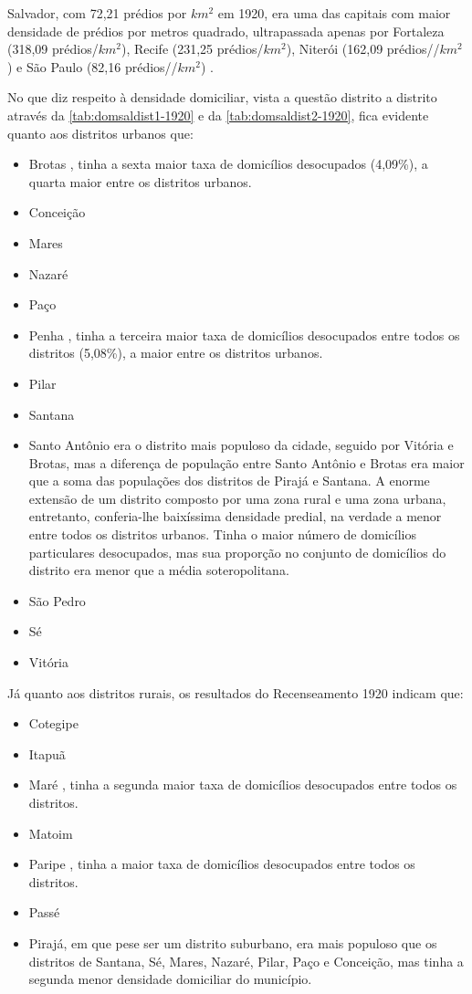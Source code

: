 Salvador, com 72,21 prédios por $km^{2}$ em 1920, era uma das capitais com maior densidade de prédios por metros quadrado, ultrapassada apenas por Fortaleza (318,09 prédios/$km^{2}$), Recife (231,25 prédios/$km^{2}$), Niterói (162,09 prédios//$km^{2}$) e São Paulo (82,16 prédios//$km^{2}$) \cite[p.~XV]{brasil_censo46_1920}.

% 

No que diz respeito à densidade domiciliar, vista a questão distrito a distrito através da \autoref{tab:domsaldist1-1920} e da \autoref{tab:domsaldist2-1920}, fica evidente quanto aos distritos urbanos que:

\begin{itemize}
 \item Brotas , tinha a sexta maior taxa de domicílios desocupados (4,09\%), a quarta maior entre os distritos urbanos.
 \item Conceição 	
 \item Mares
 \item Nazaré
 \item Paço
 \item Penha , tinha a terceira maior taxa de domicílios desocupados entre todos os distritos (5,08\%), a maior entre os distritos urbanos.
 \item Pilar
 \item Santana
 \item Santo Antônio era o distrito mais populoso da cidade, seguido por Vitória e Brotas, mas a diferença de população entre Santo Antônio e Brotas era maior que a soma das populações dos distritos de Pirajá e Santana. A enorme extensão de um distrito composto por uma zona rural e uma zona urbana, entretanto, conferia-lhe baixíssima densidade predial, na verdade a menor entre todos os distritos urbanos. Tinha o maior número de domicílios particulares desocupados, mas sua proporção no conjunto de domicílios do distrito era menor que a média soteropolitana.
 \item São Pedro
 \item Sé
 \item Vitória
\end{itemize} 	

Já quanto aos distritos rurais, os resultados do Recenseamento 1920 indicam que:
 
\begin{itemize}
 \item Cotegipe
 \item Itapuã
 \item Maré , tinha a segunda maior taxa de domicílios desocupados entre todos os distritos.
 \item Matoim
 \item Paripe , tinha a maior taxa de domicílios desocupados entre todos os distritos.
 \item Passé
 \item Pirajá, em que pese ser um distrito suburbano, era mais populoso que os distritos de Santana, Sé, Mares, Nazaré, Pilar, Paço e Conceição, mas tinha a segunda menor densidade domiciliar do município.
\end{itemize}


